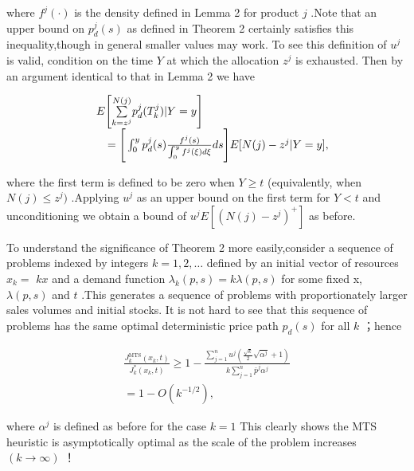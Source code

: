 where \(f ^ { j } ( \cdot )\) is the density defined in Lemma 2 for
product \(j\) .Note that an upper bound on \(p _ { d } ^ { j } ( s )\)
as defined in Theorem 2 certainly satisfies this inequality,though in
general smaller values may work. To see this definition of \(u ^ { j }\)
is valid, condition on the time \(Y\) at which the allocation
\(z ^ { j }\) is exhausted. Then by an argument identical to that in
Lemma 2 we have

\[
\begin{array} { r l } & { E \Bigg [ \underset { k = z ^ { j } } { \overset { N ( j ) } { \sum } } p _ { d } ^ { j } ( T _ { k } ^ { j } ) | Y = y \Bigg ] } \\ & { \quad = \Bigg [ \int _ { 0 } ^ { y } p _ { d } ^ { j } ( s ) \frac { f ^ { j } ( s ) } { \int _ { 0 } ^ { y } f ^ { j } ( \xi ) d \xi } d s \Bigg ] E [ N ( j ) - z ^ { j } | Y = y ] , } \end{array}
\]

where the first term is defined to be zero when \(Y \geqslant t\)
(equivalently, when \(N ( j ) \leqslant z ^ { j } )\) .Applying
\(u ^ { j }\) as an upper bound on the first term for \(Y < t\) and
unconditioning we obtain a bound of
\(u ^ { j } E [ ( N ( j ) - z ^ { j } ) ^ { + } ]\) as before.

To understand the significance of Theorem 2 more easily,consider a
sequence of problems indexed by integers \(k = 1 , 2 , \dots\) defined
by an initial vector of resources \(x _ { k } =\) \(k x\) and a demand
function \(\lambda _ { k } ( p , s ) = k \lambda ( p , s )\) for some
fixed x, \(\lambda ( p , s )\) and \(t\) .This generates a sequence of
problems with proportionately larger sales volumes and initial stocks.
It is not hard to see that this sequence of problems has the same
optimal deterministic price path \(p _ { d } ( s )\) for all \(k\)
；hence

\[
\begin{array} { l } { \displaystyle \frac { J _ { k } ^ { \mathrm { M T S } } ( x _ { k } , t ) } { J _ { k } ^ { * } ( x _ { k } , t ) } \geqslant 1 - \frac { \sum _ { j = 1 } ^ { n } u ^ { j } \left( \frac { \sqrt { k } } { 2 } \sqrt { \alpha ^ { j } } + 1 \right) } { k \sum _ { j = 1 } ^ { n } \bar { p } ^ { j } \alpha ^ { j } } } \\ { = 1 - O ( k ^ { - 1 / 2 } ) , } \end{array}
\]

where \(\alpha ^ { j }\) is defined as before for the case \(k = 1\)
This clearly shows the MTS heuristic is asymptotically optimal as the
scale of the problem increases \(( k \to \infty )\) ！

